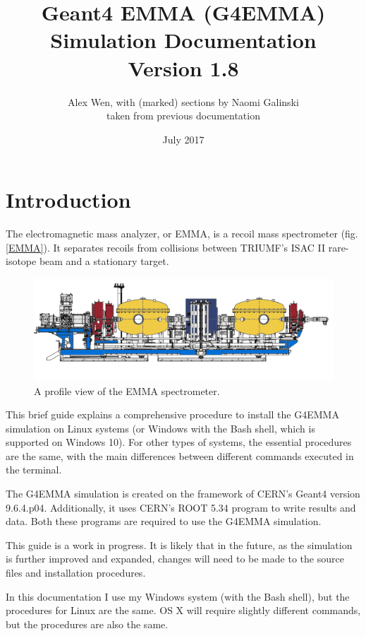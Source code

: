 \documentclass{article}
\title{Geant4 EMMA (G4EMMA) Simulation Documentation\\
Version 1.8}
\author{Alex Wen, with (marked) sections by Naomi Galinski\\
taken from previous documentation}
\date{July 2017}
\begin{document}
\maketitle

\clearpage

\tableofcontents

\clearpage

\section{Introduction}
The electromagnetic mass analyzer, or EMMA, is a recoil mass spectrometer (fig. \ref{EMMA}). It separates recoils from collisions between TRIUMF's ISAC II rare-isotope beam and a stationary target. 

\begin{figure}[h!]
\centering
\includegraphics[scale=0.15]{EMMAprofile.png}  
\caption{A profile view of the EMMA spectrometer.}
\label{EMMAprofile}
\end{figure}

This brief guide explains a comprehensive procedure to install the G4EMMA simulation on Linux systems (or Windows with the Bash shell, which is supported on Windows 10). For other types of systems, the essential procedures are the same, with the main differences between different commands executed in the terminal. 

The G4EMMA simulation is created on the framework of CERN's Geant4 version 9.6.4.p04. Additionally, it uses CERN's ROOT 5.34 program to write results and data. Both these programs are required to use the G4EMMA simulation.

This guide is a work in progress. It is likely that in the future, as the simulation is further improved and expanded, changes will need to be made to the source files and installation procedures.  

In this documentation I use my Windows system (with the Bash shell), but the procedures for Linux are the same. OS X will require slightly different commands, but the procedures are also the same. 
\end{document}
